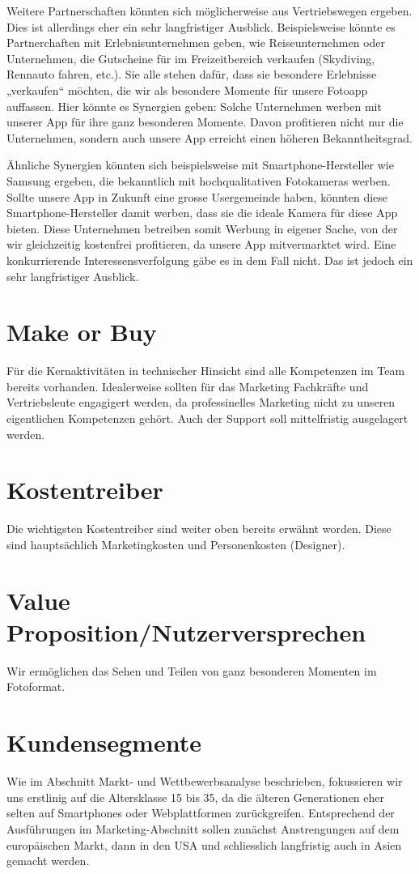 Weitere Partnerschaften könnten sich möglicherweise aus Vertriebswegen ergeben. Dies ist allerdings eher ein sehr langfristiger Ausblick. Beispielsweise könnte es Partnerchaften mit Erlebnisunternehmen geben, wie Reiseunternehmen oder Unternehmen, die Gutscheine für im Freizeitbereich verkaufen (Skydiving, Rennauto fahren, etc.). Sie alle stehen dafür, dass sie besondere Erlebnisse „verkaufen“ möchten, die wir als besondere Momente für unsere Fotoapp auffassen. Hier könnte es Synergien geben: Solche Unternehmen werben mit unserer App für ihre ganz besonderen Momente. Davon profitieren nicht nur die Unternehmen, sondern auch unsere App erreicht einen höheren Bekanntheitsgrad.

Ähnliche Synergien könnten sich beispielsweise mit Smartphone-Hersteller wie Samsung ergeben, die bekanntlich mit hochqualitativen Fotokameras werben. Sollte unsere App in Zukunft eine grosse Usergemeinde haben, könnten diese Smartphone-Hersteller damit werben, dass sie die ideale Kamera für diese App bieten. Diese Unternehmen betreiben somit Werbung in eigener Sache, von der wir gleichzeitig kostenfrei profitieren, da unsere App mitvermarktet wird. Eine konkurrierende Interessensverfolgung gäbe es in dem Fall nicht. Das ist jedoch ein sehr langfristiger Ausblick.


\section{Make or Buy}
Für die Kernaktivitäten in technischer Hinsicht sind alle Kompetenzen im Team bereits vorhanden. Idealerweise sollten für das Marketing Fachkräfte und Vertriebsleute engagigert werden, da professinelles Marketing nicht zu unseren eigentlichen Kompetenzen gehört. Auch der Support soll mittelfristig ausgelagert werden.


\section{Kostentreiber}
Die wichtigsten Kostentreiber sind weiter oben bereits erwähnt worden. Diese sind hauptsächlich Marketingkosten und Personenkosten (Designer).


\section{Value Proposition/Nutzerversprechen}
Wir ermöglichen das Sehen und Teilen von ganz besonderen Momenten im Fotoformat.


\section{Kundensegmente}
Wie im Abschnitt Markt- und Wettbewerbsanalyse beschrieben, fokussieren wir uns erstlinig auf die Altersklasse 15 bis 35, da die älteren Generationen eher selten auf Smartphones oder Webplattformen zurückgreifen. Entsprechend der Ausführungen im Marketing-Abschnitt sollen zunächst Anstrengungen auf dem europäischen Markt, dann in den USA und schliesslich langfristig auch in Asien gemacht werden.


